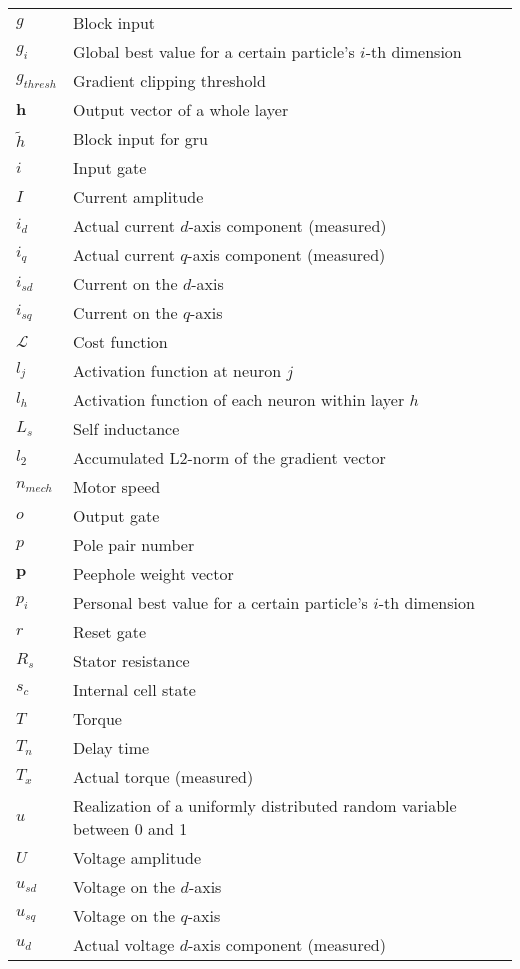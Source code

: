\begin{flushleft}
\begin{longtable}{L{4.2cm}L{11.3cm}}
   $g$ & Block input\\ 
   $g_i$ & Global best value for a certain particle's $i$-th dimension\\
   $g_{thresh}$ & Gradient clipping threshold\\
   $\bm h$ & Output vector of a whole layer\\
   $\tilde h$ & Block input for \gls{gru}\\
   $i$ & Input gate \\
   $I$ & Current amplitude\\
   $i_d$ & Actual current $d$-axis component (measured)\\
   $i_q$ & Actual current $q$-axis component (measured)\\
   $i_{sd}$ & Current on the $d$-axis \\
   $i_{sq}$ & Current on the $q$-axis \\
   $\mathcal L$ & Cost function\\
   $l_j$ & Activation function at neuron $j$\\
   $l_h$ & Activation function of each neuron within layer $h$\\
   $L_s$ & Self inductance\\
   $l_2$ & Accumulated L2-norm of the gradient vector\\
   $n_{mech}$ & Motor speed\\
   $o$ & Output gate\\
   $p$ & Pole pair number\\
   $\bm p$ & Peephole weight vector\\
   $p_i$ & Personal best value for a certain particle's $i$-th dimension\\
   $r$ & Reset gate\\
   $R_s$ & Stator resistance\\
   $s_c$ & Internal cell state\\
   $T$ & Torque\\
   $T_n$ & Delay time\\
   $T_x$ & Actual torque (measured)\\
   $u$ & Realization of a uniformly distributed random variable between 0 and 1\\
   $U$ & Voltage amplitude\\
   $u_{sd}$ & Voltage on the $d$-axis  \\
   $u_{sq}$ & Voltage on the $q$-axis  \\
   $u_d$ & Actual voltage $d$-axis component (measured)\\

\end{longtable}
\end{flushleft}
